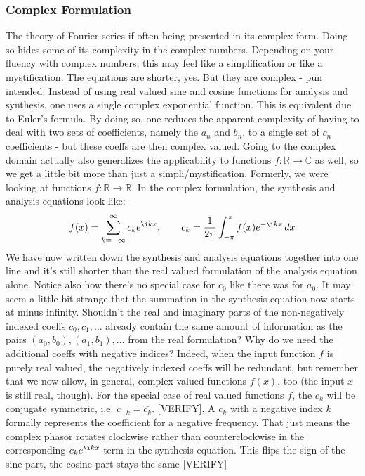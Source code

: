 \subsubsection{Complex Formulation}
The theory of Fourier series if often being presented in its complex form. Doing so hides some of its complexity in the complex numbers. Depending on your fluency with complex numbers, this may feel like a simplification or like a mystification. The equations are shorter, yes. But they are complex - pun intended. Instead of using real valued sine and cosine functions for analysis and synthesis, one uses a single complex exponential function. This is equivalent due to Euler's formula. By doing so, one reduces the apparent complexity of having to deal with two sets of coefficients, namely the $a_n$ and $b_n$, to a single set of $c_n$ coefficients - but these coeffs are then complex valued. Going to the complex domain actually also generalizes the applicability to functions $f: \mathbb{R} \rightarrow \mathbb{C}$ as well, so we get a little bit more than just a simpli/mystification. Formerly, we were looking at functions $f: \mathbb{R} \rightarrow \mathbb{R}$. In the complex formulation, the synthesis and analysis equations look like:
\begin{equation}
\label{Eq:FourierSeriesComplex}
 f(x) = \sum_{k=-\infty}^\infty c_k  e^{\i k x}, \qquad
 c_k = \frac{1}{2\pi} \int_{-\pi}^{\pi} f(x) e^{-\i k x}  \, dx
\end{equation}
We have now written down the synthesis and analysis equations together into one line and it's still shorter than the real valued formulation of the analysis equation alone. Notice also how there's no special case for $c_0$ like there was for $a_0$. It may seem a little bit strange that the summation in the synthesis equation now starts at minus infinity. Shouldn't the real and imaginary parts of the non-negatively indexed coeffs $c_0, c_1, \ldots$ already contain the same amount of information as the pairs $(a_0,b_0),(a_1,b_1), \ldots$ from the real formulation? Why do we need the additional coeffs with negative indices? Indeed, when the input function  $f$ is purely real valued, the negatively indexed coeffs will be redundant, but remember that we now allow, in general, complex valued functions $f(x)$, too (the input $x$ is still real, though). For the special case of real valued functions $f$, the $c_k$ will be conjugate symmetric, i.e. $c_{-k} = \overline{c_k}$. [VERIFY]. A $c_k$ with a negative index $k$ formally represents the coefficient for a negative frequency. That just means the complex phasor rotates clockwise rather than counterclockwise in the corresponding $c_k  e^{\i k x}$ term in the synthesis equation. This flips the sign of the sine part, the cosine part stays the same [VERIFY]

